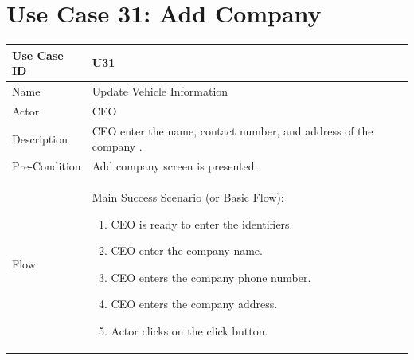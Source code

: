 \documentclass[12pt,a4paper]{report}
\begin{document}
\section{Use Case 31: Add Company }
\begin{tabular}{ | m{3cm} | m{12cm}| } \hline
Use Case ID & U31   \\\hline
Name   &   Update Vehicle Information \\ \hline
Actor &  CEO  \\ \hline
Description & CEO  enter the name, contact number, and address of the company .\\ \hline
Pre-Condition & Add company screen is presented. \\\hline
Flow & Main Success Scenario (or Basic Flow):
\begin{enumerate}
\item CEO  is ready to enter the identifiers.
\item CEO enter the company name.   
\item CEO enters the company phone number.   
\item CEO enters the company address.   
\item Actor clicks on the click button.
\end{enumerate}
\\\hline
\end{tabular}
\end{document}
